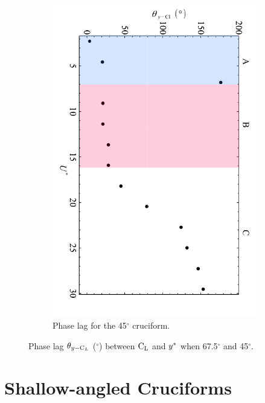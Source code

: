 \documentclass[oneside]{utmthesis}
\begin{document}
\begin{figure}[H]
  \begin{subfigure}[h]{0.9\textwidth}
    \includegraphics[angle=90,width=\textwidth]{figs/phaseLag3}
    \caption{Phase lag for the 45$^{\circ}$ cruciform.}
    \label{fig:phaseLag45deg}
  \end{subfigure}

  \caption{Phase lag $\theta_{y-\text{C}_{L}}$ ($^{\circ}$) between $\text{C}_{\text{L}}$ and $y^{*}$ when 67.5$^{\circ}$ and 45$^{\circ}$.}
  \label{fig:phaseLag67545deg}
\end{figure}

\section{Shallow-angled Cruciforms}\label{sec:kvivRegime}
\end{document}
